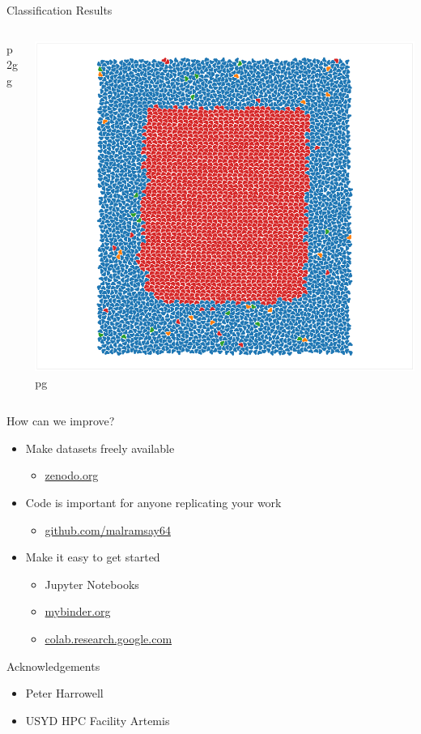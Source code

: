 \documentclass[aspectratio=169, 14pt]{beamer}
\begin{document}
\begin{frame}{Classification Results}
\begin{columns}
\begin{column}{0.33\textwidth}
      p2gg
    \end{column}
    \begin{column}{0.33\textwidth}
      \center
      \includegraphics[width=\textwidth]{classification_results_pg.png}
      pg
    \end{column}
  \end{columns}
\end{frame}


\begin{frame}{How can we improve?}

  \begin{itemize}
    \item Make datasets freely available
      \begin{itemize}
        \item \url{zenodo.org}
      \end{itemize}
    \item Code is important for anyone replicating your work
      \begin{itemize}
        \item \url{github.com/malramsay64}
      \end{itemize}
    \item Make it easy to get started
      \begin{itemize}
        \item Jupyter Notebooks
        \item \url{mybinder.org}
        \item \url{colab.research.google.com}
      \end{itemize}
  \end{itemize}

\end{frame}

\begin{frame}{Acknowledgements}

  \begin{itemize}
    \item Peter Harrowell
    \item USYD HPC Facility Artemis
  \end{itemize}

\end{frame}
\end{document}
